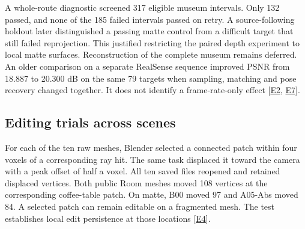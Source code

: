 \documentclass[11pt,a4paper]{article}
\begin{document}
A whole-route diagnostic screened 317 eligible museum intervals. Only 132 passed, and none of the 185 failed intervals passed on retry. A source-following holdout later distinguished a passing matte control from a difficult target that still failed reprojection. This justified restricting the paired depth experiment to local matte surfaces. Reconstruction of the complete museum remains deferred. An older comparison on a separate RealSense sequence improved PSNR from 18.887 to 20.300 dB on the same 79 targets when sampling, matching and pose recovery changed together. It does not identify a frame-rate-only effect [\hyperlink{evE2}{E2}, \hyperlink{evE7}{E7}].\par
\clearpage

\subsection{Editing trials across scenes}
For each of the ten raw meshes, Blender selected a connected patch within four voxels of a corresponding ray hit. The same task displaced it toward the camera with a peak offset of half a voxel. All ten saved files reopened and retained displaced vertices. Both public Room meshes moved 108 vertices at the corresponding coffee-table patch. On matte, B00 moved 97 and A05-Abs moved 84. A selected patch can remain editable on a fragmented mesh. The test establishes local edit persistence at those locations [\hyperlink{evE4}{E4}].\par
\end{document}
